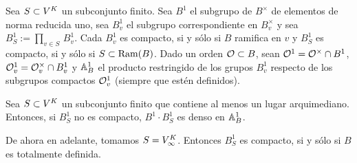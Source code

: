 Sea $S\subset\lugares{K}$ un subconjunto finito. Sea $B^{1}$
el subgrupo de $B^{\times}$ de elementos de norma reducida uno, sea
$B_{v}^{1}$ el subgrupo correspondiente en $B_{v}^{\times}$ y sea
$B_{S}^{1}:=\prod_{v\in S}\,B_{v}^{1}$. Cada $B_{v}^{1}$ es compacto, si
y s\'{o}lo si $B$ ramifica en $v$ y $B_{S}^{1}$ es compacto, si y s\'{o}lo
si $S\subset\Ram(B)$. Dado un orden $\cal{O}\subset B$, sean
$\cal{O}^{1}=\cal{O}^{\times}\cap B^{1}$,
$\cal{O}_{v}^{1}=\cal{O}_{v}^{\times}\cap B_{v}^{1}$ y $\adeles{B}^{1}$ el
producto restringido de los grupos $B_{v}^{1}$ respecto de los subgrupos
compactos $\cal{O}_{v}^{1}$ (siempre que est\'{e}n definidos).

\begin{teoAproxFuerte}%
	\label{thm:aproxfuerte}
	Sea $S\subset\lugares{K}$ un subconjunto finito que contiene al menos
	un lugar arquimediano. Entonces, si $B_{S}^{1}$ no es compacto,
	$B^{1}\cdot B_{S}^{1}$ es denso en $\adeles{B}^{1}$.
\end{teoAproxFuerte}

De ahora en adelante, tomamos $S=\lugares[\infty]{K}$. Entonces $B_{S}^{1}$ es
compacto, si y s\'{o}lo si $B$ es totalmente definida.

